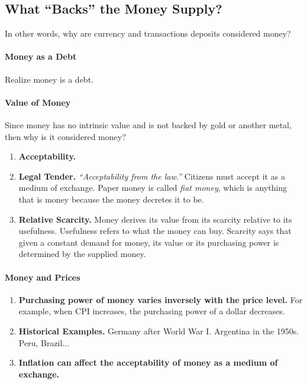 
\subsection{What ``Backs'' the Money Supply?}

In other words, why are currency and transactions deposits considered money?

\paragraph{Money as a Debt} Realize money is a debt. 

\paragraph{Value of Money} Since money has no intrinsic value and is not backed by gold or another metal, then why is it considered money?

\begin{enumerate}[label = \textbullet]
	\item \textbf{Acceptability.} 
	\item \textbf{Legal Tender.} \emph{``Acceptability from the law.''} Citizens must accept it as a medium of exchange. Paper money is called \emph{fiat money}, which is anything that is money because the money decretes it to be.
	\item \textbf{Relative Scarcity.} Money derives its value from its scarcity relative to its usefulness. Usefulness refers to what the money can buy. Scarcity says that given a constant demand for money, its value or its purchasing power is determined by the supplied money.
\end{enumerate}

\paragraph{Money and Prices}

\begin{enumerate}[label = \textbullet]
	\item \textbf{Purchasing power of money varies inversely with the price level.} For example, when CPI increases, the purchasing power of a dollar decreases.
	\item \textbf{Historical Examples.} Germany after World War I. Argentina in the 1950s. Peru, Brazil...
	\item \textbf{Inflation can affect the acceptability of money as a medium of exchange.}
\end{enumerate}

